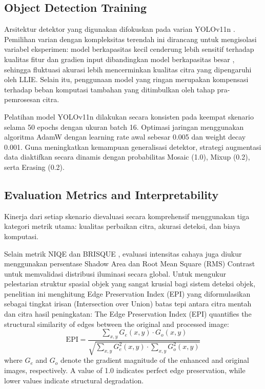 \documentclass[conference]{IEEEtran}
\begin{document}
\subsection{Object Detection Training}
Arsitektur detektor yang digunakan difokuskan pada varian YOLOv11n \cite{khanam2024yolov11}. Pemilihan varian dengan kompleksitas terendah ini dirancang untuk mengisolasi variabel eksperimen: model berkapasitas kecil cenderung lebih sensitif terhadap kualitas fitur dan gradien input dibandingkan model berkapasitas besar \cite{dobrzycki2025freezing}, sehingga fluktuasi akurasi lebih mencerminkan kualitas citra yang dipengaruhi oleh LLIE. Selain itu, penggunaan model yang ringan merupakan kompensasi terhadap beban komputasi tambahan yang ditimbulkan oleh tahap pra-pemrosesan citra.

Pelatihan model YOLOv11n dilakukan secara konsisten pada keempat skenario selama 50 epochs dengan ukuran batch 16. Optimasi jaringan menggunakan algoritma AdamW \cite{loshchilov2017sgdr} dengan learning rate awal sebesar 0.005 dan weight decay 0.001. Guna meningkatkan kemampuan generalisasi detektor, strategi augmentasi data diaktifkan secara dinamis dengan probabilitas Mosaic (1.0), Mixup (0.2), serta Erasing (0.2).

\subsection{Evaluation Metrics and Interpretability}
Kinerja dari setiap skenario dievaluasi secara komprehensif menggunakan tiga kategori metrik utama: kualitas perbaikan citra, akurasi deteksi, dan biaya komputasi. 

Selain metrik NIQE \cite{mittal2013niqe} dan BRISQUE \cite{mittal2012brisque}, evaluasi intensitas cahaya juga diukur menggunakan persentase Shadow Area dan Root Mean Square (RMS) Contrast untuk memvalidasi distribusi iluminasi secara global. Untuk mengukur pelestarian struktur spasial objek yang sangat krusial bagi sistem deteksi objek, penelitian ini menghitung Edge Preservation Index (EPI) yang diformulasikan sebagai tingkat irisan (Intersection over Union) batas tepi antara citra mentah dan citra hasil peningkatan:
The Edge Preservation Index (EPI) quantifies the structural similarity
of edges between the original and processed image:
\begin{equation}
  \text{EPI} = \frac{\sum_{x,y} G_e(x,y) \cdot G_o(x,y)}
                    {\sqrt{\sum_{x,y} G_e^2(x,y) \cdot \sum_{x,y} G_o^2(x,y)}}
\end{equation}
where $G_e$ and $G_o$ denote the gradient magnitude of the enhanced and
original images, respectively. A value of 1.0 indicates perfect edge
preservation, while lower values indicate structural degradation.
\end{document}
